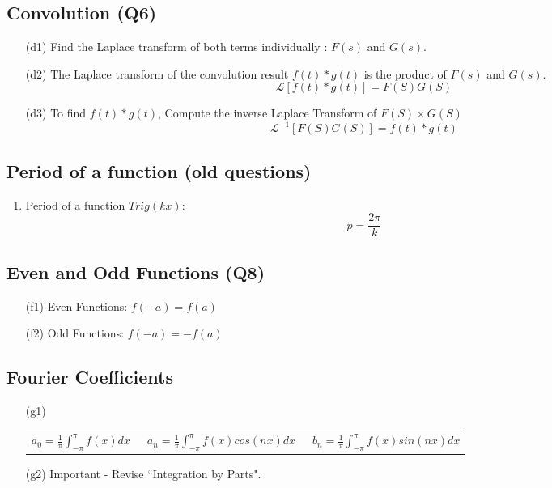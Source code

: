 \documentclass[12pt, a4paper]{article}
\theoremstyle{plain}
\theoremstyle{definition}
\theoremstyle{remark}
\begin{document}
\subsection*{Convolution (Q6)}
\begin{itemize}
\item[(d1)] Find the Laplace transform of both terms individually : $F(s)$ and $G(s)$.
\item[(d2)] The Laplace transform of the convolution result $f(t) \ast g(t)$ is the product of $F(s)$ and $G(s)$.
\[ \mathcal{L} [ f(t) \ast g(t) ] = F(S)G(S) \]
\item[(d3)] To find $f(t) \ast g(t)$, Compute the inverse Laplace Transform of $F(S)\times G(S)$
\[ \mathcal{L}^{-1}[ F(S)G(S)] = f(t) \ast g(t) \]
\end{itemize}

\subsection*{Period of a function (old questions)}
\begin{enumerate}
\item Period of a function $Trig(kx)$:
\[ p =\frac{2\pi}{k} \]
\end{enumerate}
\subsection*{Even and Odd Functions (Q8)}
\begin{itemize}
\item[(f1)] Even Functions: $f(-a) = f(a)$
\item[(f2)] Odd Functions: $f(-a) = -f(a)$
\end{itemize}

\subsection*{Fourier Coefficients}
\begin{itemize}
\item[(g1)]

\begin{tabular}{lcr}
  
  $a_0 = \frac{1}{\pi}\int^{\pi }_{-\pi} f(x) dx$ & \mbox{     }$ a_n = \frac{1}{\pi}\int^{\pi }_{-\pi} f(x) cos(nx) dx $ & \mbox{     }$b_n = \frac{1}{\pi}\int^{\pi }_{-\pi} f(x) sin(nx) dx$ \\

\end{tabular}
\item[(g2)] Important - Revise ``Integration by Parts".
\end{itemize}
\end{document}
